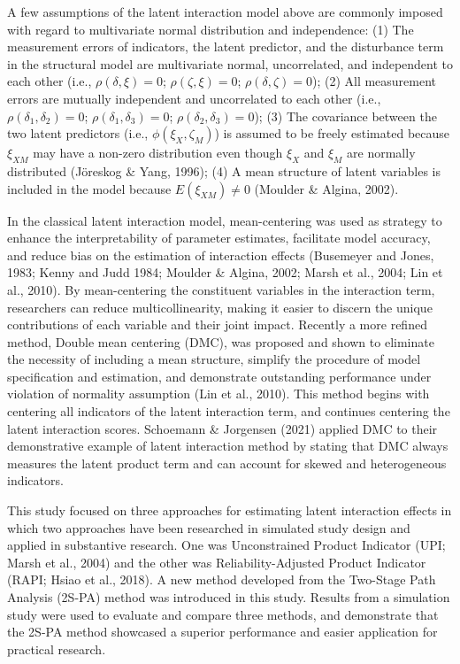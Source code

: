 \documentclass[
  man]{apa7}
\begin{document}
A few assumptions of the latent interaction model above are commonly imposed with regard to multivariate normal distribution and independence: (1) The measurement errors of indicators, the latent predictor, and the disturbance term in the structural model are multivariate normal, uncorrelated, and independent to each other (i.e., \(\rho(\delta, \xi) = 0\); \(\rho(\zeta, \xi) = 0\); \(\rho(\delta, \zeta) = 0\)); (2) All measurement errors are mutually independent and uncorrelated to each other (i.e., \(\rho(\delta_{1}, \delta_{2}) = 0\); \(\rho(\delta_{1}, \delta_{3}) = 0\); \(\rho(\delta_{2}, \delta_{3}) = 0\)); (3) The covariance between the two latent predictors (i.e., \(\phi(\xi_{X}, \zeta_{M})\)) is assumed to be freely estimated because \(\xi_{XM}\) may have a non-zero distribution even though \(\xi_{X}\) and \(\xi_{M}\) are normally distributed (Jöreskog \& Yang, 1996); (4) A mean structure of latent variables is included in the model because \(E(\xi_{XM}) \neq 0\) (Moulder \& Algina, 2002).

In the classical latent interaction model, mean-centering was used as strategy to enhance the interpretability of parameter estimates, facilitate model accuracy, and reduce bias on the estimation of interaction effects (Busemeyer and Jones, 1983; Kenny and Judd 1984; Moulder \& Algina, 2002; Marsh et al., 2004; Lin et al., 2010). By mean-centering the constituent variables in the interaction term, researchers can reduce multicollinearity, making it easier to discern the unique contributions of each variable and their joint impact. Recently a more refined method, Double mean centering (DMC), was proposed and shown to eliminate the necessity of including a mean structure, simplify the procedure of model specification and estimation, and demonstrate outstanding performance under violation of normality assumption (Lin et al., 2010). This method begins with centering all indicators of the latent interaction term, and continues centering the latent interaction scores. Schoemann \& Jorgensen (2021) applied DMC to their demonstrative example of latent interaction method by stating that DMC always measures the latent product term and can account for skewed and heterogeneous indicators.

This study focused on three approaches for estimating latent interaction effects in which two approaches have been researched in simulated study design and applied in substantive research. One was Unconstrained Product Indicator (UPI; Marsh et al., 2004) and the other was Reliability-Adjusted Product Indicator (RAPI; Hsiao et al., 2018). A new method developed from the Two-Stage Path Analysis (2S-PA) method was introduced in this study. Results from a simulation study were used to evaluate and compare three methods, and demonstrate that the 2S-PA method showcased a superior performance and easier application for practical research.
\end{document}
